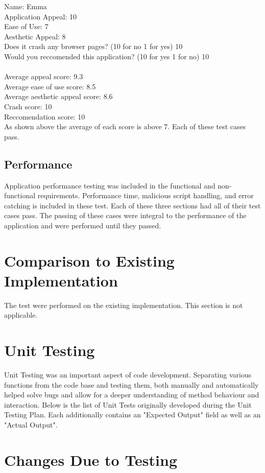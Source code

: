 \documentclass[12pt, titlepage]{article}
\begin{document}
Name: Emma\\
Application Appeal: 10 \\ 
Ease of Use: 7\\ 
Aesthetic Appeal: 8\\ 
Does it crash any browser pages? (10 for no 1 for yes) 10\\ 
Would you reccomended this application? (10 for yes 1 for no) 10\\ 
\\
Average appeal score:  9.3
\\
Average ease of use score: 8.5
\\
Average aesthetic appeal score: 8.6
\\
Crash score: 10
\\
Reccomendation score: 10
\\
As shown above the average of each score is above 7. Each of these test cases pass.
\subsection{Performance}
Application performance testing was included in the functional and non-functional requirements. Performance time, malicious script handling, and error catching is included in these test. Each of these three sections had all of their test cases pass. The passing of these cases were integral to the performance of the application and were performed until they passed. 
	
\section{Comparison to Existing Implementation}	
The test were performed on the existing implementation. This section is not applicable.
\section{Unit Testing}

Unit Testing was an important aspect of code development. Separating various functions from the code base and testing them, both manually and automatically helped solve bugs and allow for a deeper understanding of method behaviour and interaction. Below is the list of Unit Tests originally developed during the Unit Testing Plan. Each additionally contains an "Expected Output" field as well as an "Actual Output".

\section{Changes Due to Testing}
\end{document}
